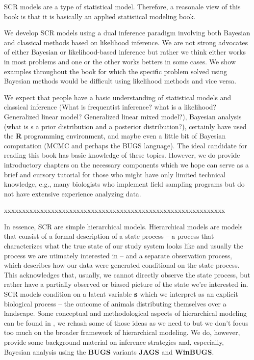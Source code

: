 SCR models are a type of statistical model. Therefore, a reasonale
view of this book is that it is basically an applied statistical
modeling book.

We develop SCR models using a dual inference paradigm involving both
Bayesian and classical methods based on likelihood inference.  We are
not strong advocates of either Bayesian or likelihood-based inference
but rather we think either works in most problems and one or the other
works betters in some cases.  We show examples throughout the book for
which the specific problem solved using Bayesian methods would be
difficult using likelihood methods and vice versa.

We expect that people have a basic understanding of statistical models 
and classical inference (What is frequentist inference? what is a 
likelihood? Generalized linear model? Generalized linear mixed 
model?), Bayesian analysis (what is s a prior distribution and a 
posterior distribution?), certainly have used the {\bf R} programming 
environment, and maybe even a little bit of Bayesian computation (MCMC 
and perhaps the BUGS language).  The ideal candidate for reading this 
book has basic knowledge of these topics. However, we do provide 
introductory chapters on the necessary components which we hope can 
serve as a brief and cursory tutorial for those who might have only 
limited technical knowledge, e.g., many biologists who implement field 
sampling programs but do not have extensive experience analyzing data. 


xxxxxxxxxxxxxxxxxxxxxxxxxxxxxxxxxxxxxxxxxxxxxxxxxxxxxxxxxxxxx

In essence, SCR are
simple hierarchical models.  Hierarchical models are models that
consist of a formal description of a state process -- a process that
characterizes what the true state of our study system looks like and
usually the process we are utimately interested in -- and a separate
observation process, which describes how our data were generated
conditional on the state process. This acknowledges that, usually, we
cannot directly observe the state process, but rather have a partially
observed or biased picture of the state we're interested in.  SCR
models condition on a latent variable ${\bf s}$ which we interpret as
an explicit biological process -- the outcome of animals distributing
themselves over a landscape.  Some conceptual and methodological
aspects of hierarchical modeling can be found in
\citet{royle_dorazio:2008}, we rehash some of those ideas as we need
to but we don't focus too much on the broader framework of
hierarchical modeling.  We do, however, provide some background
material on inference strategies and, especially, Bayesian analysis
using the {\bf BUGS} variants {\bf JAGS} and {\bf WinBUGS}.






